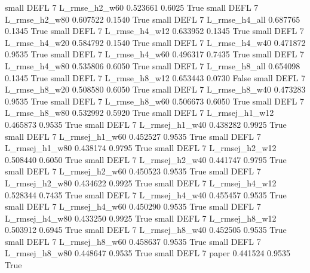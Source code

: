      small     DEFL                 7  L_rmse_h2_w60   0.523661      0.6025    True
     small     DEFL                 7  L_rmse_h2_w80   0.607522      0.1540    True
     small     DEFL                 7  L_rmse_h4_all   0.687765      0.1345    True
     small     DEFL                 7  L_rmse_h4_w12   0.633952      0.1345    True
     small     DEFL                 7  L_rmse_h4_w20   0.584792      0.1540    True
     small     DEFL                 7  L_rmse_h4_w40   0.471872      0.9535    True
     small     DEFL                 7  L_rmse_h4_w60   0.496317      0.7435    True
     small     DEFL                 7  L_rmse_h4_w80   0.535806      0.6050    True
     small     DEFL                 7  L_rmse_h8_all   0.654098      0.1345    True
     small     DEFL                 7  L_rmse_h8_w12   0.653443      0.0730   False
     small     DEFL                 7  L_rmse_h8_w20   0.508580      0.6050    True
     small     DEFL                 7  L_rmse_h8_w40   0.473283      0.9535    True
     small     DEFL                 7  L_rmse_h8_w60   0.506673      0.6050    True
     small     DEFL                 7  L_rmse_h8_w80   0.532992      0.5920    True
     small     DEFL                 7 L_rmsej_h1_w12   0.465873      0.9535    True
     small     DEFL                 7 L_rmsej_h1_w40   0.438282      0.9925    True
     small     DEFL                 7 L_rmsej_h1_w60   0.452527      0.9535    True
     small     DEFL                 7 L_rmsej_h1_w80   0.438174      0.9795    True
     small     DEFL                 7 L_rmsej_h2_w12   0.508440      0.6050    True
     small     DEFL                 7 L_rmsej_h2_w40   0.441747      0.9795    True
     small     DEFL                 7 L_rmsej_h2_w60   0.450523      0.9535    True
     small     DEFL                 7 L_rmsej_h2_w80   0.434622      0.9925    True
     small     DEFL                 7 L_rmsej_h4_w12   0.528344      0.7435    True
     small     DEFL                 7 L_rmsej_h4_w40   0.455457      0.9535    True
     small     DEFL                 7 L_rmsej_h4_w60   0.450290      0.9535    True
     small     DEFL                 7 L_rmsej_h4_w80   0.433250      0.9925    True
     small     DEFL                 7 L_rmsej_h8_w12   0.503912      0.6945    True
     small     DEFL                 7 L_rmsej_h8_w40   0.452505      0.9535    True
     small     DEFL                 7 L_rmsej_h8_w60   0.458637      0.9535    True
     small     DEFL                 7 L_rmsej_h8_w80   0.448647      0.9535    True
     small     DEFL                 7          paper   0.441524      0.9535    True
